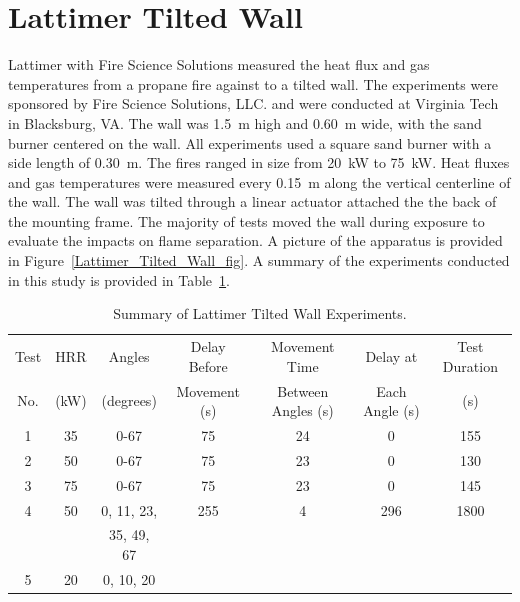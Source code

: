 \section{Lattimer Tilted Wall}
\label{Lattimer_Tilted_Wall_Description}

Lattimer with Fire Science Solutions measured the heat flux and gas temperatures from a propane fire against to a tilted wall.
The experiments were sponsored by Fire Science Solutions, LLC. and were conducted at Virginia Tech in Blacksburg, VA.
The wall was 1.5~m high and 0.60~m wide, with the sand burner centered on the wall.
All experiments used a square sand burner with a side length of 0.30~m.
The fires ranged in size from 20~kW to 75~kW.
Heat fluxes and gas temperatures were measured every 0.15~m along the vertical centerline of the wall.
The wall was tilted through a linear actuator attached the the back of the mounting frame.
The majority of tests moved the wall during exposure to evaluate the impacts on flame separation.
A picture of the apparatus is provided in Figure~\ref{Lattimer_Tilted_Wall_fig}.
A summary of the experiments conducted in this study is provided in Table~\ref{Lattimer_Tilted_Wall_tab}.

\begin{table}[!htb]
\caption[Summary of JH/FRA Rail Car Experiments]{Summary of Lattimer Tilted Wall Experiments.}
\begin{center}
\begin{tabular}{|c|c|c|c|c|c|c|}
\hline
Test & HRR  & Angles    & Delay Before & Movement Time      & Delay at         & Test Duration \\
No.  & (kW) & (degrees) & Movement (s) & Between Angles (s) & Each Angle (s)   & (s)           \\ \hline \hline
1    & 35   & 0-67      & 75                    & 24                           & 0                   & 155           \\ \hline
2    & 50   & 0-67      & 75                    & 23                           & 0                   & 130           \\ \hline
3    & 75   & 0-67      & 75                    & 23                           & 0                   & 145           \\ \hline
4    & 50   & 0, 11, 23,  & 255                 & 4                            & 296                 & 1800          \\
     &      & 35, 49, 67  &                     &                              &                     &               \\ \hline
5    & 20   & 0, 10, 20 &                       &                              &                     &               \\ \hline
\end{tabular}
\end{center}
\label{Lattimer_Tilted_Wall_tab}
\end{table}


